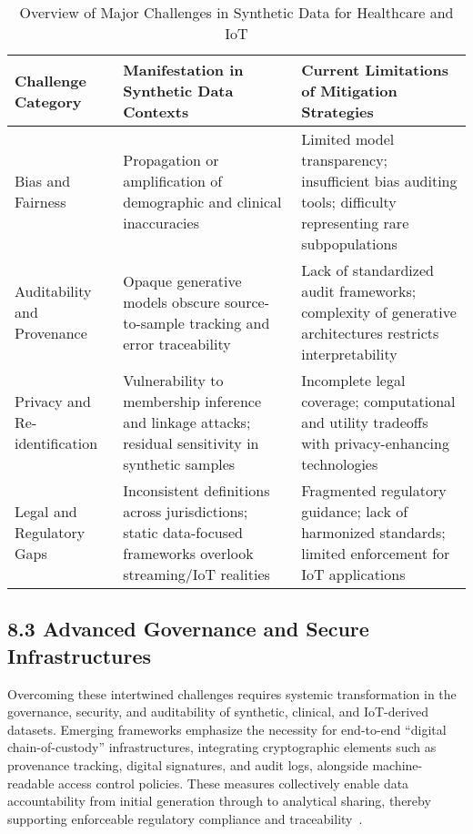 \documentclass[11pt]{article}
\begin{document}
\begin{table}[h]
\centering
\caption{Overview of Major Challenges in Synthetic Data for Healthcare and IoT}
\label{tab:challenges_overview}
\begin{tabular}{|p{3.5cm}|p{4.5cm}|p{4.5cm}|}
\hline
\textbf{Challenge Category} & \textbf{Manifestation in Synthetic Data Contexts} & \textbf{Current Limitations of Mitigation Strategies} \\
\hline
Bias and Fairness & Propagation or amplification of demographic and clinical inaccuracies & Limited model transparency; insufficient bias auditing tools; difficulty representing rare subpopulations \\
\hline
Auditability and Provenance & Opaque generative models obscure source-to-sample tracking and error traceability & Lack of standardized audit frameworks; complexity of generative architectures restricts interpretability \\
\hline
Privacy and Re-identification & Vulnerability to membership inference and linkage attacks; residual sensitivity in synthetic samples & Incomplete legal coverage; computational and utility tradeoffs with privacy-enhancing technologies\\
\hline
Legal and Regulatory Gaps & Inconsistent definitions across jurisdictions; static data-focused frameworks overlook streaming/IoT realities & Fragmented regulatory guidance; lack of harmonized standards; limited enforcement for IoT applications \\
\hline
\end{tabular}
\end{table}

\subsection{8.3 Advanced Governance and Secure Infrastructures}

Overcoming these intertwined challenges requires systemic transformation in the governance, security, and auditability of synthetic, clinical, and IoT-derived datasets. Emerging frameworks emphasize the necessity for end-to-end “digital chain-of-custody” infrastructures, integrating cryptographic elements such as provenance tracking, digital signatures, and audit logs, alongside machine-readable access control policies. These measures collectively enable data accountability from initial generation through to analytical sharing, thereby supporting enforceable regulatory compliance and traceability~\cite{ref4, ref5, ref10, ref13, ref14, ref16, ref17, ref18, ref19, ref20, ref21, ref22, ref23, ref24, ref25, ref30, ref31, ref33, ref34, ref35, ref44, ref45, ref46, ref50, ref51, ref61, ref62, ref64, ref65, ref76, ref77, ref91, ref106}.
\end{document}
